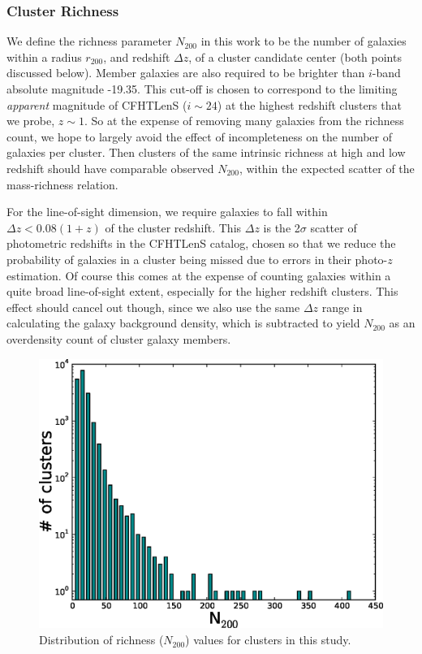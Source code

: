 \subsubsection{Cluster Richness}
\label{rich}
We define the richness parameter $N_{200}$ in this work to be the number of galaxies within a radius $r_{200}$, and redshift $\Delta z$, of a cluster candidate center (both points discussed below). Member galaxies are also required to be brighter than $i$-band absolute magnitude -19.35. This cut-off is chosen to correspond to the limiting {\it apparent} magnitude of CFHTLenS ($i \sim 24$) at the highest redshift clusters that we probe, $z \sim 1$. So at the expense of removing many galaxies from the richness count, we hope to largely avoid the effect of incompleteness on the number of galaxies per cluster. Then clusters of the same intrinsic richness at high and low redshift should have comparable observed $N_{200}$, within the expected scatter of the mass-richness relation.

For the line-of-sight dimension, we require galaxies to fall within $\Delta z < 0.08(1+z)$ of the cluster redshift. This $\Delta z$ is the 2$\sigma$ scatter of photometric redshifts in the CFHTLenS catalog, chosen so that we reduce the probability of galaxies in a cluster being missed due to errors in their photo-$z$ estimation. Of course this comes at the expense of counting galaxies within a quite broad line-of-sight extent, especially for the higher redshift clusters. This effect should cancel out though, since we also use the same $\Delta z$ range in calculating the galaxy background density, which is subtracted to yield $N_{200}$ as an overdensity count of cluster galaxy members.

\begin{figure}
\begin{center}
\includegraphics[scale=0.6]{plots_ch3/N200histogram.eps}
\caption[3D-MF Cluster Richness Distribution]{Distribution of richness ($N_{200}$) values for clusters in this study.}
\label{hist}
\end{center}
\end{figure}

